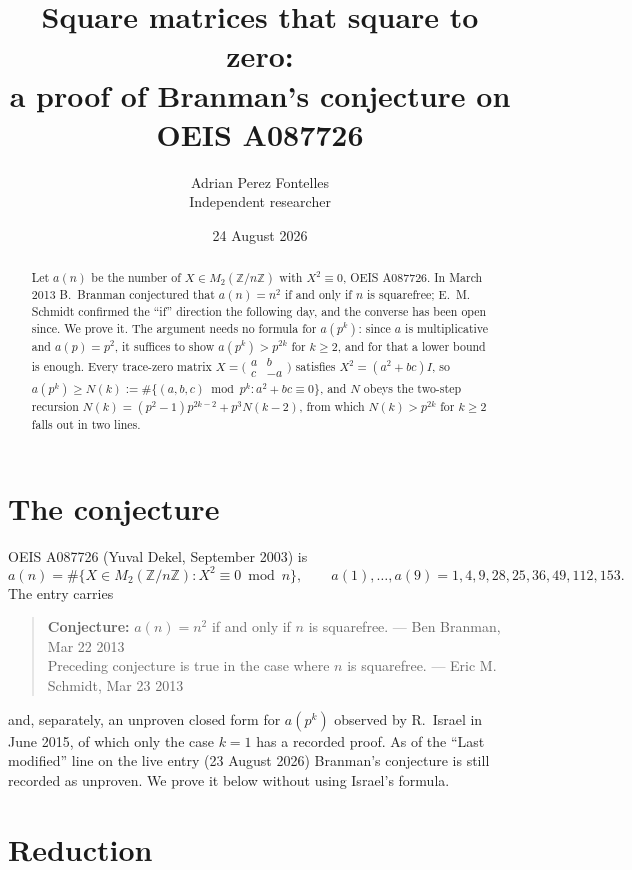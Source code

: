 \documentclass[11pt,a4paper]{article}
\title{Square matrices that square to zero:\\
a proof of Branman's conjecture on OEIS A087726}
\author{Adrian Perez Fontelles\\ \small Independent researcher}
\date{24 August 2026}
\theoremstyle{plain}
\theoremstyle{definition}
\begin{document}
\maketitle

\begin{abstract}
Let $a(n)$ be the number of $X\in M_{2}(\mathbb{Z}/n\mathbb{Z})$ with $X^{2}\equiv0$, OEIS
A087726. In March 2013 B.~Branman conjectured that $a(n)=n^{2}$ if and only if $n$ is
squarefree; E.~M. Schmidt confirmed the ``if'' direction the following day, and the
converse has been open since. We prove it. The argument needs no formula for $a(p^{k})$:
since $a$ is multiplicative and $a(p)=p^{2}$, it suffices to show $a(p^{k})>p^{2k}$ for
$k\ge2$, and for that a lower bound is enough. Every trace-zero matrix
$X=\bigl(\begin{smallmatrix}a&b\\c&-a\end{smallmatrix}\bigr)$ satisfies
$X^{2}=(a^{2}+bc)I$, so
$a(p^{k})\ge N(k):=\#\{(a,b,c)\bmod p^{k}:a^{2}+bc\equiv0\}$, and $N$ obeys the two-step
recursion $N(k)=(p^{2}-1)p^{2k-2}+p^{3}N(k-2)$, from which $N(k)>p^{2k}$ for $k\ge2$ falls
out in two lines.
\end{abstract}

\section{The conjecture}

OEIS A087726 (Yuval Dekel, September 2003) is
\[
  a(n)=\#\bigl\{X\in M_{2}(\mathbb{Z}/n\mathbb{Z}):X^{2}\equiv0\bmod n\bigr\},
  \qquad a(1),\dots,a(9)=1,4,9,28,25,36,49,112,153.
\]
The entry carries

\begin{quote}
\textbf{Conjecture:} $a(n)=n^{2}$ if and only if $n$ is squarefree. --- Ben Branman,
Mar 22 2013\\
Preceding conjecture is true in the case where $n$ is squarefree. --- Eric M. Schmidt,
Mar 23 2013
\end{quote}

and, separately, an unproven closed form for $a(p^{k})$ observed by R.~Israel in June 2015,
of which only the case $k=1$ has a recorded proof. As of the ``Last modified'' line on the
live entry (23 August 2026) Branman's conjecture is still recorded as unproven. We prove it
below without using Israel's formula.

\section{Reduction}
\end{document}
